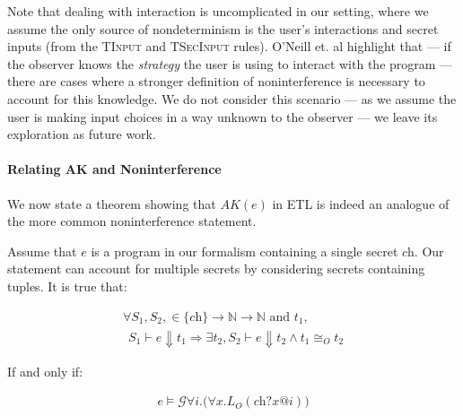 \documentclass[conference]{IEEEtran}
\theoremstyle{definition}
\newcommand{\sch}{\textit{ch}}
\newcommand{\prin}{\textit{O}}
\newcommand{\tr}{t\xspace}
\newcommand{\talways}{\mathcal{G}}
\begin{document}
Note that dealing with interaction is uncomplicated in our setting,
where we assume the only source of nondeterminism is the user's
interactions and secret inputs (from the \textsc{TInput} and
\textsc{TSecInput} rules).  O'Neill et. al \cite{O'Neill:2006}
highlight that --- if the observer knows the \emph{strategy} the user
is using to interact with the program --- there are cases where a
stronger definition of noninterference is necessary to account for this
knowledge.  We do not consider this scenario --- as we assume the user
is making input choices in a way unknown to the observer --- we leave
its exploration as future work.

\paragraph*{Relating AK and Noninterference}

We now state a theorem showing that $AK(e)$ in ETL is indeed an
analogue of the more common noninterference statement.

\begin{Theorem}
  Assume that $e$ is a program in our formalism containing a single
  secret $\sch$.  Our statement can account for multiple secrets
  by considering secrets containing tuples. It is true that:
  
  \begin{displaymath}
    \begin{array}{l}
      \forall S_1, S_2, \in \{\sch\} \to \mathbb{N} \to \mathbb{N} \text{~and~} \tr_1, \\
      ~~ S_1 \vdash e \Downarrow \tr_1 \Rightarrow \exists \tr_2, S_2
      \vdash e \Downarrow \tr_2
      \land \tr_1 \cong_{\prin} \tr_2
    \end{array}
  \end{displaymath}
    
  If and only if: 

  \begin{displaymath}
    \begin{array}{l}
      e \models \talways \forall i. \big( \forall x. L_O(\sch ? x @
      i) \big)
    \end{array}
  \end{displaymath}
\end{Theorem}
\end{document}
